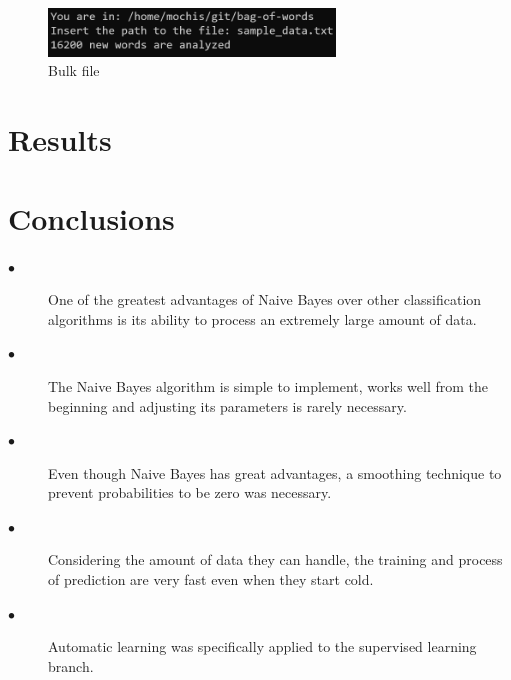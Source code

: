 \documentclass[sigconf,12pt,review=false,natbib=false]{acmart}
\begin{document}
\begin{figure}[h!]
    \centering
    \includegraphics[width=3in]{bulk_file}
    \caption{Bulk file}
    \label{fig:bulk_file}
\end{figure}

\section{Results}


\section{Conclusions}

\begin{description}
    \item[$\bullet$] One of the greatest advantages of Naive Bayes over other classification algorithms is its ability
      to process an extremely large amount of data. \\
  \item[$\bullet$] The Naive Bayes algorithm is simple to implement, works well from the beginning and adjusting its
      parameters is rarely necessary. \\
  \item[$\bullet$] Even though Naive Bayes has great advantages, a smoothing technique to prevent probabilities to be
      zero was necessary. \\
  \item[$\bullet$] Considering the amount of data they can handle, the training and process of prediction are very
      fast even when they start cold. \\
  \item[$\bullet$] Automatic learning was specifically applied to the supervised learning branch. \\
\end{description}

\nocite{*}
\printbibliography
\end{document}
